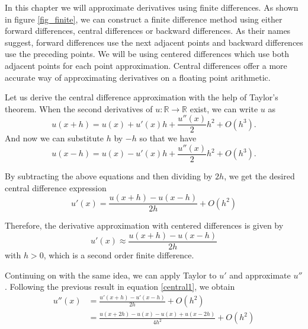 \documentclass[00main.tex]{subfiles}
\begin{document}
In this chapter we will approximate derivatives using finite differences. As shown in figure \ref{fig_finite}, we can construct a finite difference method using either forward differences, central differences or backward differences. As their names suggest, forward differences use the next adjacent points and backward differences use the preceding points. We will be using centered differences which use both adjacent points for each point approximation. Central differences offer a more accurate way of approximating derivatives on a floating point arithmetic. %


Let us derive the central difference approximation with the help of Taylor's theorem. When the second derivatives of $u:\mathbb{R}\to \mathbb{R}$ exist, %
 we can write $u$ as \[ u(x+h) = u(x) + u'(x) h + \frac{u''(x)}{2} h^2 +O(h^3).\]
And now we can substitute $h$ by $-h$ so that we have \[ u(x-h) = u(x) - u'(x) h + \frac{u''(x)}{2} h^2 +O(h^3).\]

By subtracting the above equations and then dividing by $2h$, we get the desired central difference expression \[u' (x) = \frac{u(x + h) - u(x-h)}{2h} + O(h^2)\]

Therefore, the derivative approximation with centered differences is given by \begin{equation}
u' (x) \approx \frac{u (x+h) - u(x-h)}{2h} \label{central1}
\end{equation} with $h > 0$, which is a second order finite difference. %


Continuing on with the same idea, we can apply Taylor to $u'$ and approximate $u''$. Following the previous result in equation \ref{central1}, we obtain \begin{align*}
u'' (x) &= \frac{u'(x + h) - u'(x-h)}{2h} + O(h^2)\\
 &= \frac{u(x+2h) - u(x) - u(x) + u(x-2h)}{4h^2} + O(h^2)
\end{align*}
\end{document}
